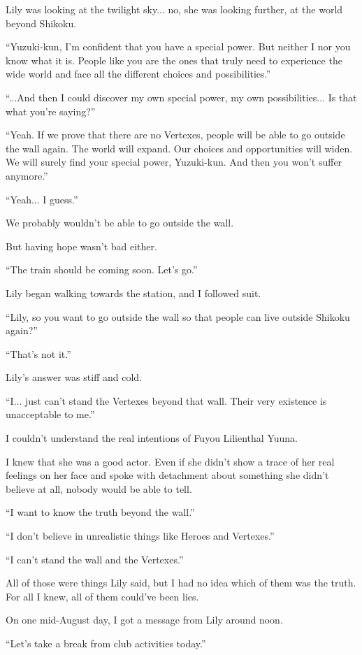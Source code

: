 Lily was looking at the twilight sky... no, she was looking further, at the world beyond Shikoku.

``Yuzuki-kun, I'm confident that you have a special power. But neither I nor you know what it is. People like you are the ones that truly need to experience the wide world and face all the different choices and possibilities.''

``...And then I could discover my own special power, my own possibilities... Is that what you're saying?''

``Yeah. If we prove that there are no Vertexes, people will be able to go outside the wall again. The world will expand. Our choices and opportunities will widen. We will surely find your special power, Yuzuki-kun. And then you won't suffer anymore.''

``Yeah... I guess.''

We probably wouldn't be able to go outside the wall.

But having hope wasn't bad either.

``The train should be coming soon. Let's go.''

Lily began walking towards the station, and I followed suit.

``Lily, so you want to go outside the wall so that people can live outside Shikoku again?''

``That's not it.''

Lily's answer was stiff and cold.

``I... just can't stand the Vertexes beyond that wall. Their very existence is unacceptable to me.''

I couldn't understand the real intentions of Fuyou Lilienthal Yuuna.

I knew that she was a good actor. Even if she didn't show a trace of her real feelings on her face and spoke with detachment about something she didn't believe at all, nobody would be able to tell.

``I want to know the truth beyond the wall.''

``I don't believe in unrealistic things like Heroes and Vertexes.''

``I can't stand the wall and the Vertexes.''

All of those were things Lily said, but I had no idea which of them was the truth. For all I knew, all of them could've been lies.

On one mid-August day, I got a message from Lily around noon.

``Let's take a break from club activities today.''

